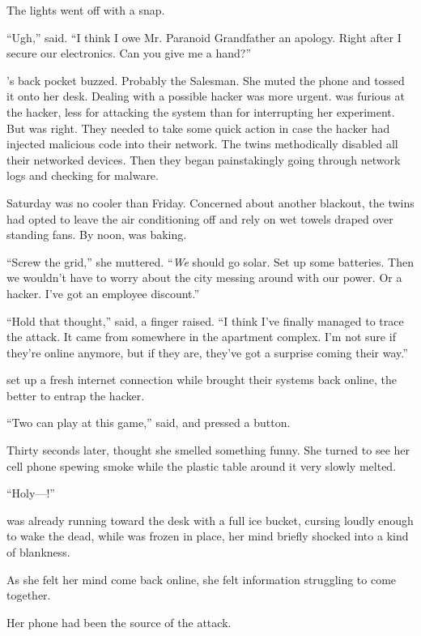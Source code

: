 The lights went off with a snap.

``Ugh,'' {\sidetag} said. ``I think I owe Mr. Paranoid Grandfather an apology. Right after I secure our electronics. Can you give me a hand?''

{\protag}'s back pocket buzzed. Probably the Salesman. She muted the phone and tossed it onto her desk. Dealing with a possible hacker was more urgent. {\protag} was furious at the hacker, less for attacking the system than for interrupting her experiment. But {\sidetag} was right. They needed to take some quick action in case the hacker had injected malicious code into their network. The twins methodically disabled all their networked devices. Then they began painstakingly going through network logs and checking for malware.

Saturday was no cooler than Friday. Concerned about another blackout, the twins had opted to leave the air conditioning off and rely on wet towels draped over standing fans. By noon, {\protag} was baking.

``Screw the grid,'' she muttered. ``\emph{We} should go solar. Set up some batteries. Then we wouldn't have to worry about the city messing around with our power. Or a hacker. I've got an employee discount.''

``Hold that thought,'' {\sidetag} said, a finger raised. ``I think I've finally managed to trace the attack. It came from somewhere in the apartment complex. I'm not sure if they're online anymore, but if they are, they've got a surprise coming their way.''

{\sidetag} set up a fresh internet connection while {\protag} brought their systems back online, the better to entrap the hacker.

``Two can play at this game,'' {\sidetag} said, and pressed a button.

Thirty seconds later, {\protag} thought she smelled something funny. She turned to see her cell phone spewing smoke while the plastic table around it very slowly melted.

``Holy---{\sidetag}!''

{\sidetag} was already running toward the desk with a full ice bucket, cursing loudly enough to wake the dead, while {\protag} was frozen in place, her mind briefly shocked into a kind of blankness.

As she felt her mind come back online, she felt information struggling to come together.

Her phone had been the source of the attack.

